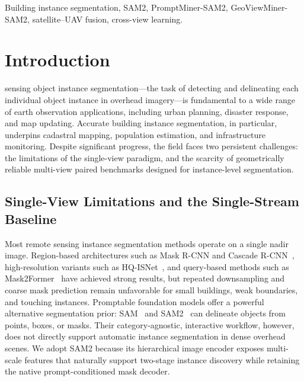 \documentclass[letterpaper,journal]{IEEEtran}
\begin{document}
\begin{abstract}
validate the effectiveness of each component and demonstrate the benefit of cross-view fusion for satellite-view building instance segmentation.
\end{abstract}

\begingroup
{}
\begin{IEEEkeywords}
Building instance segmentation, SAM2, PromptMiner-SAM2, GeoViewMiner-SAM2, satellite--UAV fusion, cross-view learning.
\end{IEEEkeywords}
\endgroup


\section{Introduction}
 sensing object instance segmentation---the task of detecting and delineating each individual object instance in overhead imagery---is fundamental to a wide range of earth observation applications, including urban planning, disaster response, and map updating. Accurate building instance segmentation, in particular, underpins cadastral mapping, population estimation, and infrastructure monitoring. Despite significant progress, the field faces two persistent challenges: the limitations of the single-view paradigm, and the scarcity of geometrically reliable multi-view paired benchmarks designed for instance-level segmentation.

\subsection{Single-View Limitations and the Single-Stream Baseline}

Most remote sensing instance segmentation methods operate on a single nadir image. Region-based architectures such as Mask R-CNN and Cascade R-CNN~\cite{ref_maskrcnn,ref_cascade}, high-resolution variants such as HQ-ISNet~\cite{ref_hqisnet}, and query-based methods such as Mask2Former~\cite{ref_mask2former} have achieved strong results, but repeated downsampling and coarse mask prediction remain unfavorable for small buildings, weak boundaries, and touching instances. Promptable foundation models offer a powerful alternative segmentation prior: SAM~\cite{ref_sam} and SAM2~\cite{ref_sam2} can delineate objects from points, boxes, or masks. Their category-agnostic, interactive workflow, however, does not directly support automatic instance segmentation in dense overhead scenes. We adopt SAM2 because its hierarchical image encoder exposes multi-scale features that naturally support two-stage instance discovery while retaining the native prompt-conditioned mask decoder.
\end{document}

